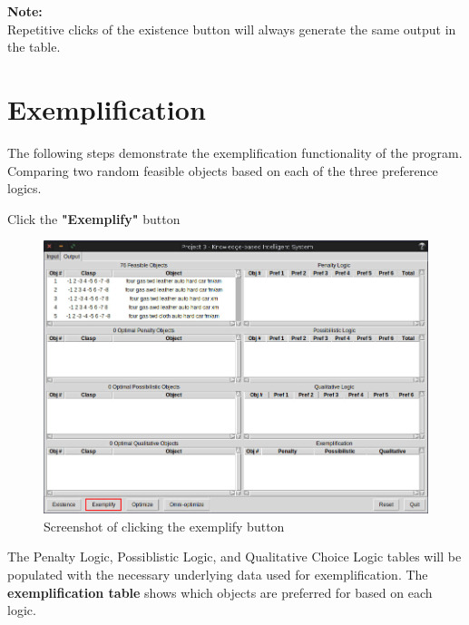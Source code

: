 \documentclass[12pt]{report}
\begin{document}
\textbf{Note:} \\
Repetitive clicks of the existence button will always generate the same output in the table.

\newpage
\section{Exemplification}
\vspace{.75em}
The following steps demonstrate the exemplification functionality of the program. \\
Comparing two random feasible objects based on each of the three preference logics.\\

\begin{description}[leftmargin=4em]
\item [Step 1:] Click the \textbf{"Exemplify"} button
\begin{figure}[H]
\begin{center}
\includegraphics[scale=0.3,trim=1cm 1cm 1cm 1cm]{exemplify}
\caption{Screenshot of clicking the exemplify button}
\end{center}
\end{figure}
\vspace{-2.5em}
\item [Result:] The Penalty Logic, Possiblistic Logic, and Qualitative Choice Logic tables will be populated with the necessary underlying data used for exemplification. The \textbf{exemplification table} shows which objects are preferred for based on each logic.
\begin{figure}[H]
\begin{center}

\end{center}
\end{figure}
\end{description}
\end{document}
